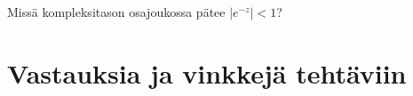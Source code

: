 \documentclass[a4paper, 12pt]{article}
\theoremstyle{remark}
\theoremstyle{definition}
\begin{document}
\begin{teht} Missä kompleksitason osajoukossa pätee $\left|e^{-z}\right|<1$? \end{teht}



\clearpage
\section*{Vastauksia ja vinkkejä tehtäviin}
\linespread{1.667}
\setcounter{teht}{0}
\begin{teht}


\end{teht}


\begin{teht}


\end{teht}

\begin{teht}


\end{teht}



\begin{teht}


\end{teht}


\begin{teht}


\end{teht}



\begin{teht}


\end{teht}


\begin{teht}


\end{teht}


\begin{teht}


\end{teht}


\begin{teht}


\end{teht}


\begin{teht}


\end{teht}


\begin{teht}


\end{teht}
\end{document}
